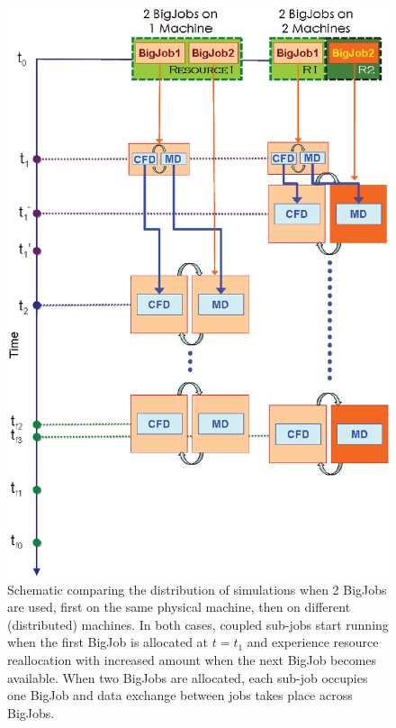 \documentclass[conference,final]{IEEEtran}
\begin{document}
\begin{figure}
  \centering \includegraphics[scale=0.40]{Simulation_Time_of_Two_BigJobs.eps} \caption{\small
    Schematic comparing the distribution of simulations when 2 BigJobs
    are used, first on the same physical machine, then on different
    (distributed) machines. In both cases, coupled sub-jobs start
    running when the first BigJob is allocated at $t=t_1$ and
    experience resource reallocation with increased amount when the
    next BigJob becomes available. When two BigJobs are allocated,
    each sub-job occupies one BigJob and data exchange between jobs
    takes place across BigJobs.}  \label{Fig:TwoBigJobs} \end{figure}
\end{document}
